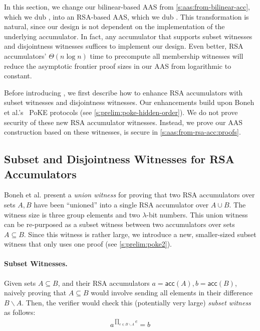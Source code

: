 In this section, we change our bilinear-based AAS from \cref{s:aas:from-bilinear-acc}, which we dub \biaas, into an RSA-based AAS, which we dub \rsaaas.
This transformation is natural, since our \biaas design is not dependent on the implementation of the underlying accumulator.
In fact, any accumulator that supports subset witnesses and disjointness witnesses suffices to implement our design.
Even better, RSA accumulators' $\Theta(n\log{n})$ time to precompute all membership witnesses will reduce the asymptotic frontier proof sizes in our AAS from logarithmic to constant.

Before introducing \rsaaas, we first describe how to enhance RSA accumulators with subset witnesses and disjointness witnesses.
Our enhancements build upon Boneh et al.'s~\cite{BBF18,BBF19} PoKE protocols (see \cref{s:prelim:poke-hidden-order}).
We do not prove security of these new RSA accumulator witnesses.
Instead, we prove our AAS construction based on these witnesses, is secure in \cref{s:aas:from-rsa-acc:proofs}.

\subsection{Subset and Disjointness Witnesses for RSA Accumulators}
\label{s:aas:from-rsa-acc:rsa-acc-enhance}

Boneh et al. present a \textit{union witness} for proving that two RSA accumulators over sets $A, B$ have been ``unioned'' into a single RSA accumulator over $A\cup B$.
The witness size is three group elements and two $\lambda$-bit numbers.
This union witness can be re-purposed as a subset witness between two accumulators over sets $A \subseteq B$.
Since this witness is rather large, we introduce a new, smaller-sized subset witness that only uses one \poketwo proof (see \cref{s:prelim:poke2}).

\paragraph{Subset Witnesses.}
Given sets $A\subseteq B$, and their RSA accumulators $a=\mathsf{acc}(A),b=\mathsf{acc}(B)$, naively proving that $A\subseteq B$ would involve sending all elements in their difference $B\backslash A$.
Then, the verifier would check this (potentially very large) \textit{subset witness} as follows:
\begin{align*}
    a^{\prod_{e\in{B\backslash A}} e} = b
\end{align*}

